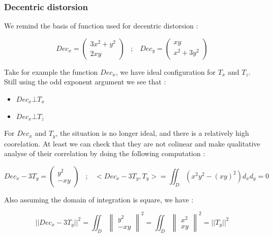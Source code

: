 \subsubsection{Decentric distorsion}

We remind the basis of function used for decentric distorsion :

\begin{equation}
	  Dec_x = \begin{pmatrix} 3 x^2 + y^2 \\ 2  x y  \end{pmatrix}
\;\;\;  ; \;\;\;  
	  Dec_y = \begin{pmatrix}  x y   \\  x^2 + 3 y^2  \end{pmatrix}
\end{equation}

Take for example the function $Dec_x$,  we have ideal configuration for $T_x$ and $T_z$.
Still using the odd exponent argument we see that :

\begin{itemize}
	\item $Dec_x  \bot T_x$
	\item $Dec_x  \bot T_z$
\end{itemize}

For $Dec_x$ and $T_y$, the situation is no longer ideal, and there is a relatively
high coorelation. At least we can check that they are not colinear and make qualitative analyse
of their correlation by doing the following computation :


\begin{equation}
	Dec_x   - 3 T_y = \begin{pmatrix}  y^2   \\ -xy  \end{pmatrix}
\;\;\;  ; \;\;\;  
	<Dec_x   - 3 T_y ,T_y> = \iint_D (x^2y^2 -(xy)^2)   d_x d_y   =0
\end{equation}

Also assuming the domain of integration is square, we have :

\begin{equation}
	||Dec_x   - 3 T_y || ^2  = \iint_D \begin{Vmatrix}  y^2   \\ -xy  \end{Vmatrix} ^2
	                         = \iint_D \begin{Vmatrix}  x^2   \\ xy  \end{Vmatrix} ^2
	                         = || T_y || ^2  
\end{equation}

